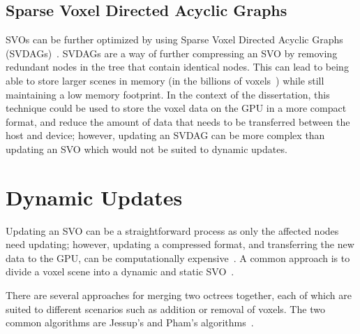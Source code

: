 \subsection{Sparse Voxel Directed Acyclic Graphs}
SVOs can be further optimized by using Sparse Voxel Directed Acyclic Graphs (SVDAGs)~\cite{Kampe_Sintorn_Assarsson_2013}.
SVDAGs are a way of further compressing an SVO by removing redundant nodes in the tree that contain identical nodes. This
can lead to being able to store larger scenes in memory (in the billions of voxels~\cite{Kampe_Sintorn_Assarsson_2013})
while still maintaining a low memory footprint. In the context of the dissertation, this technique could be used to store
the voxel data on the GPU in a more compact format, and reduce the amount of data that needs to be transferred between the
host and device; however, updating an SVDAG can be more complex than updating an SVO which would not be suited to dynamic updates.

\section{Dynamic Updates}
Updating an SVO can be a straightforward process as only the affected nodes need updating; however, updating a compressed
format, and transferring the new data to the GPU, can be computationally expensive~\cite{Crassin_2012}. A common approach
is to divide a voxel scene into a dynamic and static SVO~\cite{Douglas_2022,Pan_2021}.

There are several approaches for merging two octrees together, each of which are suited to different scenarios such as
addition or removal of voxels. The two common algorithms are Jessup's and Pham's algorithms~\cite{Jessup_2014,Pham_2007}.
